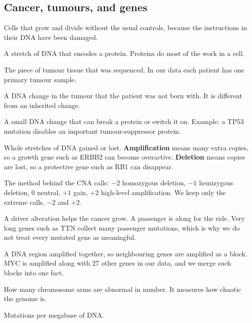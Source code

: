 \documentclass[11pt,a4paper]{article}
\newcommand{\term}[1]{\textbf{#1}}
\begin{document}
\subsection{Cancer, tumours, and genes}
\begin{description}[leftmargin=0pt,labelsep=0.5em]
  \item[Cancer] Cells that grow and divide without the usual controls, because the instructions in their DNA have been damaged.
  \item[Gene] A stretch of DNA that encodes a protein. Proteins do most of the work in a cell.
  \item[Tumour sample] The piece of tumour tissue that was sequenced. In our data each patient has one primary tumour sample.
  \item[Somatic alteration] A DNA change in the tumour that the patient was not born with. It is different from an inherited change.
  \item[Mutation] A small DNA change that can break a protein or switch it on. Example: a TP53 mutation disables an important tumour-suppressor protein.
  \item[Copy number alteration (CNA)] Whole stretches of DNA gained or lost. \term{Amplification} means many extra copies, so a growth gene such as ERBB2 can become overactive. \term{Deletion} means copies are lost, so a protective gene such as RB1 can disappear.
  \item[GISTIC] The method behind the CNA calls: $-2$ homozygous deletion, $-1$ hemizygous deletion, $0$ neutral, $+1$ gain, $+2$ high-level amplification. We keep only the extreme calls, $-2$ and $+2$.
  \item[Driver and passenger] A driver alteration helps the cancer grow. A passenger is along for the ride. Very long genes such as TTN collect many passenger mutations, which is why we do not treat every mutated gene as meaningful.
  \item[Amplicon] A DNA region amplified together, so neighbouring genes are amplified as a block. MYC is amplified along with 27 other genes in our data, and we merge such blocks into one fact.
  \item[Aneuploidy score] How many chromosome arms are abnormal in number. It measures how chaotic the genome is.
  \item[Tumour mutational burden (TMB)] Mutations per megabase of DNA.
\end{description}
\end{document}
